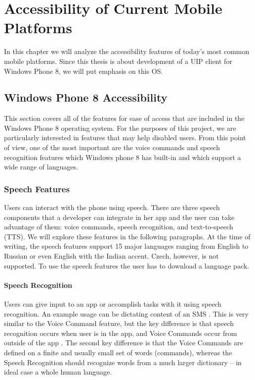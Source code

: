 \section{Accessibility of Current Mobile Platforms}
In this chapter we will analyze the accessibility features of today's most common mobile platforms. Since this thesis is about development of a UIP client for Windows Phone 8, we will put emphasis on this OS.

\subsection{Windows Phone 8 Accessibility}
This section covers all of the features for ease of access that are included in the Windows Phone 8 operating system. For the purposes of this project, we are particularly interested in features that may help disabled users. From this point of view, one of the most important are the voice commands and speech recognition features which Windows phone 8 has built-in and which support a wide range of languages.

\subsubsection{Speech Features}
Users can interact with the phone using speech. There are three speech components that a developer can integrate in her app and the user can take advantage of them: voice commands, speech recognition, and text-to-speech (TTS). We will explore these features in the following paragraphs.
At the time of writing, the speech features support 15 major languages ranging from English to Russian or even English with the Indian accent. Czech, however, is not supported. To use the speech features the user has to download a language pack.

\paragraph{Speech Recognition}
Users can give input to an app or accomplish tasks with it using speech recognition. An example usage can be dictating content of an SMS \cite{phone8speech}. This is very similar to the Voice Command feature, but the key difference is that speech recognition occurs when user is in the app, and Voice Commands occur from outside of the app \cite{phone8speech}. The second key difference is that the Voice Commands are defined on a finite and usually small set of words (commands), whereas the Speech Recognition should recognize words from a much larger dictionary – in ideal case a whole human language.

